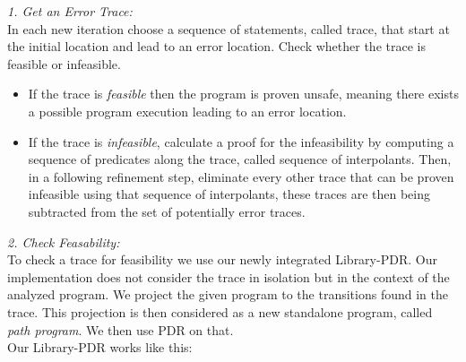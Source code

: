 \documentclass[11pt, a4paper, BCOR=10mm, ngerman]{scrbook}
\begin{document}
\textsl{1. Get an Error Trace:} \\
In each new iteration choose a sequence of statements, called trace, that start at the initial location and lead to an error location. Check whether the trace is feasible or infeasible.
 \begin{itemize}
	\item If the trace is \textsl{feasible} then the program is proven unsafe, meaning there exists a possible program execution leading to an error location.
	\item If the trace is \textsl{infeasible}, calculate a proof for the infeasibility by computing a sequence of predicates along the trace, called sequence of interpolants. Then, in a following refinement step, eliminate every other trace that can be proven infeasible using that sequence of interpolants, these traces are then being subtracted from the set of potentially error traces.
 \end{itemize}

\textsl{2. Check Feasability:} \\
To check a trace for feasibility we use our newly integrated Library-PDR. 
Our implementation does not consider the trace in isolation but in the context of the analyzed program. We project the given program to the transitions found in the trace. This projection is then considered as a new standalone program, called \textsl{path program}. We then use PDR on that. \\ Our Library-PDR works like this:
\end{document}
